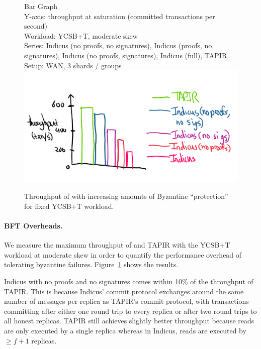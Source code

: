 \begin{figure}
  Bar Graph\\
  Y-axis: throughput at saturation (committed transactions per second)\\
  Workload: YCSB+T, moderate skew\\
  Series: Indicus (no proofs, no signatures), Indicus (proofs, no signatures),
    Indicus (no proofs, signatures), Indicus (full), TAPIR\\
  Setup: WAN, 3 shards / groups\\
  \includegraphics[width=\columnwidth]{figures/eval/bft-overhead-tput.png}
  \caption{Throughput of \sys{} with increasing amounts of Byzantine
  ``protection'' for fixed YCSB+T workload.}
  \label{fig:bft-overhead-tput}
\end{figure}

\paragraph{BFT Overheads.} We measure the maximum throughput of \sys{} and TAPIR with the YCSB+T workload at moderate skew in order to quantify the performance overhead of tolerating byzantine failures.
Figure~\ref{fig:bft-overhead-tput} shows the results.

Indicus with no proofs and no signatures comes within 10\% of the throughput of
TAPIR. This is because Indicus' commit protocol exchanges around the same
number of messages per replica as TAPIR's commit protocol, with
transactions committing after either one round trip to every replica or after
two round trips to all honest replicas.  TAPIR still achieves slightly
better throughput because reads are only executed by a single replica whereas in
Indicus, reads are executed by $\geq f+1$ replicas. 



